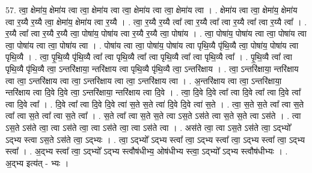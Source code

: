 \documentclass[17pt]{extarticle}
\begin{document}
57. त्वा॒ क्षेमा॑य॒ क्षेमा॑य त्वा त्वा॒ क्षेमा॑य त्वा त्वा॒ क्षेमा॑य त्वा त्वा॒ क्षेमा॑य त्वा । . क्षेमा॑य त्वा त्वा॒ क्षेमा॑य॒ क्षेमा॑य त्वा र॒य्यै र॒य्यै त्वा॒ क्षेमा॑य॒ क्षेमा॑य त्वा र॒य्यै । . त्वा॒ र॒य्यै र॒य्यै त्वा᳚ त्वा र॒य्यै त्वा᳚ त्वा र॒य्यै त्वा᳚ त्वा र॒य्यै त्वा᳚ । . र॒य्यै त्वा᳚ त्वा र॒य्यै र॒य्यै त्वा॒ पोषा॑य॒ पोषा॑य त्वा र॒य्यै र॒य्यै त्वा॒ पोषा॑य । . त्वा॒ पोषा॑य॒ पोषा॑य त्वा त्वा॒ पोषा॑य त्वा त्वा॒ पोषा॑य त्वा त्वा॒ पोषा॑य त्वा । . पोषा॑य त्वा त्वा॒ पोषा॑य॒ पोषा॑य त्वा पृथि॒व्यै पृ॑थि॒व्यै त्वा॒ पोषा॑य॒ पोषा॑य त्वा पृथि॒व्यै । . त्वा॒ पृ॒थि॒व्यै पृ॑थि॒व्यै त्वा᳚ त्वा पृथि॒व्यै त्वा᳚ त्वा पृथि॒व्यै त्वा᳚ त्वा पृथि॒व्यै त्वा᳚ । . पृ॒थि॒व्यै त्वा᳚ त्वा पृथि॒व्यै पृ॑थि॒व्यै त्वा॒ ऽन्तरि॑क्षाया॒ न्तरि॑क्षाय त्वा पृथि॒व्यै पृ॑थि॒व्यै त्वा॒ ऽन्तरि॑क्षाय । . त्वा॒ ऽन्तरि॑क्षाया॒ न्तरि॑क्षाय त्वा त्वा॒ ऽन्तरि॑क्षाय त्वा त्वा॒ ऽन्तरि॑क्षाय त्वा त्वा॒ ऽन्तरि॑क्षाय त्वा । . अ॒न्तरि॑क्षाय त्वा त्वा॒ ऽन्तरि॑क्षाया॒ न्तरि॑क्षाय त्वा दि॒वे दि॒वे त्वा॒ ऽन्तरि॑क्षाया॒ न्तरि॑क्षाय त्वा दि॒वे । . त्वा॒ दि॒वे दि॒वे त्वा᳚ त्वा दि॒वे त्वा᳚ त्वा दि॒वे त्वा᳚ त्वा दि॒वे त्वा᳚ । . दि॒वे त्वा᳚ त्वा दि॒वे दि॒वे त्वा॑ स॒ते स॒ते त्वा॑ दि॒वे दि॒वे त्वा॑ स॒ते । . त्वा॒ स॒ते स॒ते त्वा᳚ त्वा स॒ते त्वा᳚ त्वा स॒ते त्वा᳚ त्वा स॒ते त्वा᳚ । . स॒ते त्वा᳚ त्वा स॒ते स॒ते त्वा ऽस॒ते ऽस॑ते त्वा स॒ते स॒ते त्वा ऽस॑ते । . त्वा ऽस॒ते ऽस॑ते त्वा॒ त्वा ऽस॑ते त्वा॒ त्वा ऽस॑ते त्वा॒ त्वा ऽस॑ते त्वा । . अस॑ते त्वा॒ त्वा ऽस॒ते ऽस॑ते त्वा॒ ऽद्भ्यो᳚ ऽद्भ्य स्त्वा ऽस॒ते ऽस॑ते त्वा॒ ऽद्भ्यः । . त्वा॒ ऽद्भ्यो᳚ ऽद्भ्य स्त्वा᳚ त्वा॒ ऽद्भ्य स्त्वा᳚ त्वा॒ ऽद्भ्य स्त्वा᳚ त्वा॒ ऽद्भ्य स्त्वा᳚ । . अ॒द्भ्य स्त्वा᳚ त्वा॒ ऽद्भ्यो᳚ ऽद्भ्य स्त्वौष॑धीभ्य॒ ओष॑धीभ्य स्त्वा॒ ऽद्भ्यो᳚ ऽद्भ्य स्त्वौष॑धीभ्यः । . अ॒द्भ्य इत्य॑त् - भ्यः । \newline
\end{document}
